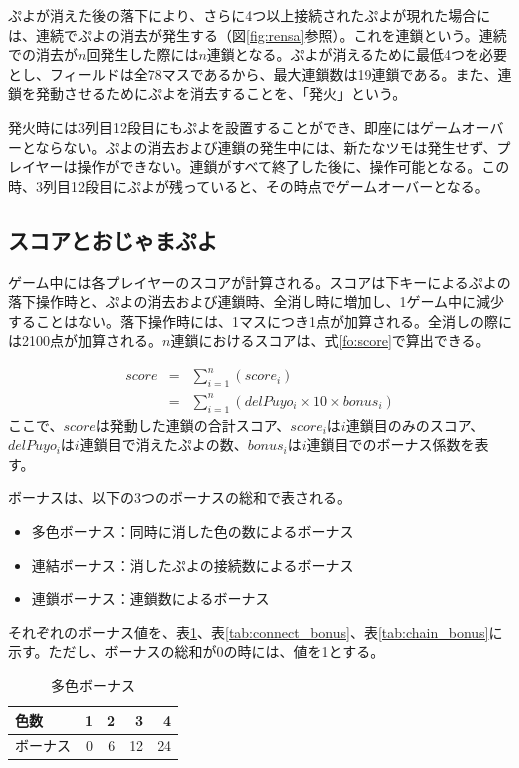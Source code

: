 \documentclass[12pt]{jreport}
\begin{document}
ぷよが消えた後の落下により、さらに4つ以上接続されたぷよが現れた場合には、連続でぷよの消去が発生する（図\ref{fig:rensa}参照）。これを連鎖という。連続での消去が$n$回発生した際には$n$連鎖となる。ぷよが消えるために最低4つを必要とし、フィールドは全78マスであるから、最大連鎖数は19連鎖である。また、連鎖を発動させるためにぷよを消去することを、「発火」という。

発火時には3列目12段目にもぷよを設置することができ、即座にはゲームオーバーとならない。ぷよの消去および連鎖の発生中には、新たなツモは発生せず、プレイヤーは操作ができない。連鎖がすべて終了した後に、操作可能となる。この時、3列目12段目にぷよが残っていると、その時点でゲームオーバーとなる。

\subsection{スコアとおじゃまぷよ} \label{score_ojama}
ゲーム中には各プレイヤーのスコアが計算される。スコアは下キーによるぷよの落下操作時と、ぷよの消去および連鎖時、全消し時に増加し、1ゲーム中に減少することはない。落下操作時には、1マスにつき1点が加算される。全消しの際には2100点が加算される。$n$連鎖におけるスコアは、式\ref{fo:score}で算出できる。

\begin{eqnarray} \label{fo:score}
score & = & \sum_{i=1}^{n}(score_{i}) \nonumber \\
& = & \sum_{i=1}^{n}(delPuyo_{i} \times 10 \times bonus_{i})
\end{eqnarray}
ここで、$score$は発動した連鎖の合計スコア、$score_{i}$は$i$連鎖目のみのスコア、$delPuyo_{i}$は$i$連鎖目で消えたぷよの数、$bonus_{i}$は$i$連鎖目でのボーナス係数を表す。

ボーナスは、以下の3つのボーナスの総和で表される。
\begin{itemize}
\item 多色ボーナス：同時に消した色の数によるボーナス
\item 連結ボーナス：消したぷよの接続数によるボーナス
\item 連鎖ボーナス：連鎖数によるボーナス
\end{itemize}
それぞれのボーナス値を、表\ref{tab:color_bonus}、表\ref{tab:connect_bonus}、表\ref{tab:chain_bonus}に示す。ただし、ボーナスの総和が0の時には、値を1とする。

\begin{table}[tb]
\begin{center}
\caption{多色ボーナス} \label{tab:color_bonus}
\begin{tabular}{|l|r|r|r|r|} \hline
色数 & 1 & 2 & 3 & 4\\ \hline
ボーナス & 0 & 6 & 12 & 24\\ \hline
\end{tabular}
\end{center}
\end{table}
\end{document}
